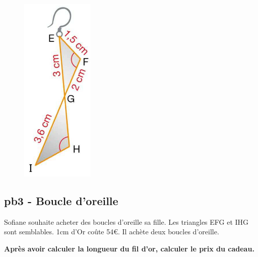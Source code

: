 \horrule{1px}

\begin{minipage}[t]{0.2\textwidth}
  \begin{figure}[H]
  \includegraphics[width=0.6\linewidth]{4x3-triangles-semblables/ie-pb3.png}
  \end{figure}
\end{minipage}
\begin{minipage}[t]{0.75\textwidth}
  \subsection*{pb3 - Boucle d'oreille}

  Sofiane souhaite acheter des boucles d'oreille sa fille. Les triangles EFG et IHG sont semblables. 1cm d'Or coûte 54€. Il achète deux boucles d'oreille.  

\textbf{Après avoir calculer la longueur du fil d'or, calculer le prix du cadeau. }
\end{minipage}

